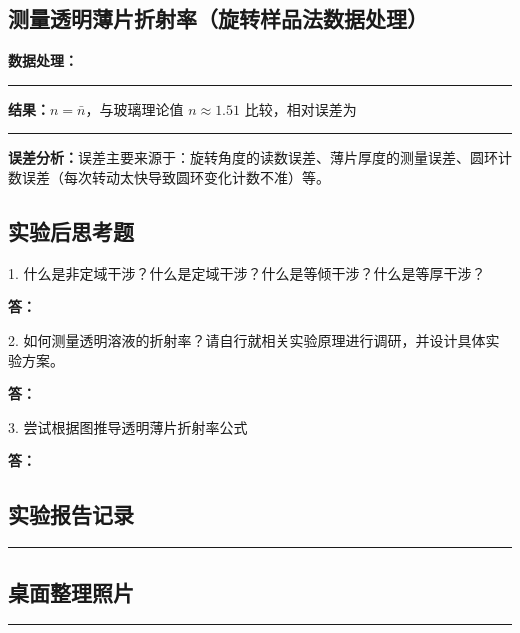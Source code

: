 \documentclass[dvipsnames, svgnames,a4paper,11pt]{article}
\newcommand{\answerblank}[1][3.8cm]{%
  \par\nopagebreak[4]\noindent\textbf{答：}\par\nopagebreak[4]\vspace*{#1}}
\newcommand{\recordblank}[1]{%
  \par\noindent\rule{0.95\linewidth}{0pt}\rule{0pt}{#1}\par}
\begin{document}
\subsection{测量透明薄片折射率（旋转样品法数据处理）}
\textbf{数据处理：}
\recordblank{3.2cm}
\textbf{结果：}$n = \bar{n}$，与玻璃理论值 $n \approx 1.51$ 比较，相对误差为
\recordblank{3.2cm}
\textbf{误差分析：}误差主要来源于：旋转角度的读数误差、薄片厚度的测量误差、圆环计数误差（每次转动太快导致圆环变化计数不准）等。
\clearpage
\subsection{实验后思考题}

\begin{question}
	1. 什么是非定域干涉？什么是定域干涉？什么是等倾干涉？什么是等厚干涉？
\end{question}
\answerblank[3.8cm]

\begin{question}
	2. 如何测量透明溶液的折射率？请自行就相关实验原理进行调研，并设计具体实验方案。
\end{question}
\answerblank[3.8cm]

\begin{question}
	3. 尝试根据图推导透明薄片折射率公式
\end{question}
\answerblank[3.8cm]

\clearpage
\appendix
\appendixpage
\addappheadtotoc
\subsection{实验报告记录}
\recordblank{5.5cm}
\subsection{桌面整理照片}
\recordblank{5.5cm}
\end{document}
